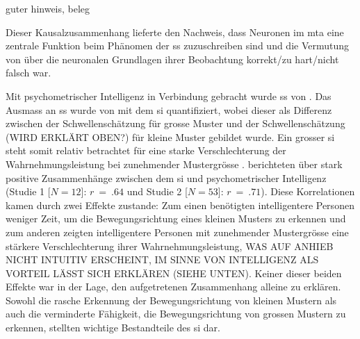 \documentclass[11pt, twoside, a4paper]{book}		%
\begin{document}
guter hinweis, beleg

Dieser Kausalzusammenhang lieferte den Nachweis, dass Neuronen im \gls{mta} eine zentrale Funktion beim Phänomen der \gls{ss} zuzuschreiben sind und die Vermutung von \citet{Tadin2003} über die neuronalen Grundlagen ihrer Beobachtung korrekt/zu hart/nicht falsch war. 

Mit psychometrischer Intelligenz in Verbindung gebracht wurde \gls{ss} von \citet{Melnick2013}.
Das Ausmass an \gls{ss} wurde von \citeauthor{Melnick2013} mit dem \gls{si} quantifiziert, wobei dieser als Differenz zwischen der Schwellenschätzung für grosse Muster und der Schwellenschätzung (WIRD ERKLÄRT OBEN?) für kleine Muster gebildet wurde. Ein grosser \gls{si} steht somit relativ betrachtet für eine starke Verschlechterung der Wahrnehmungsleistung bei zunehmender Mustergrösse \citep[das heisst einer stark ausgeprägten \gls{ss};][]{Tadin2006}. \citeauthor{Melnick2013} berichteten über stark positive Zusammenhänge zwischen dem \gls{si} und psychometrischer Intelligenz (Studie 1 [$N=12$]: $r~=~.64$ und Studie 2 [$N=53$]: $r~=~.71$). Diese Korrelationen kamen durch zwei Effekte zustande: Zum einen benötigten intelligentere Personen weniger Zeit, um die Bewegungsrichtung eines kleinen Musters zu erkennen und zum anderen zeigten intelligentere Personen mit zunehmender Mustergrösse eine stärkere Verschlechterung ihrer Wahrnehmungsleistung, WAS AUF ANHIEB NICHT INTUITIV ERSCHEINT, IM SINNE VON INTELLIGENZ ALS VORTEIL LÄSST SICH ERKLÄREN (SIEHE UNTEN). Keiner dieser beiden Effekte war in der Lage, den aufgetretenen Zusammenhang alleine zu erklären. Sowohl die rasche Erkennung der Bewegungsrichtung von kleinen Mustern als auch die verminderte Fähigkeit, die Bewegungsrichtung von grossen Mustern zu erkennen, stellten wichtige Bestandteile des \gls{si} dar. 
\end{document}
